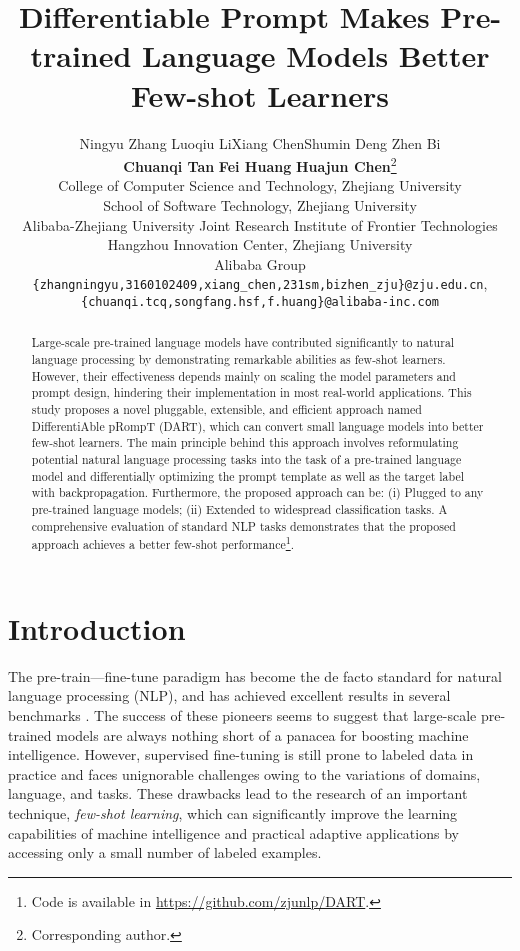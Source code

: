 \documentclass{article} \usepackage{iclr2022_conference,times}
\title{Differentiable Prompt Makes Pre-trained Language Models Better Few-shot Learners}
\author{Ningyu Zhang \quad Luoqiu Li\quad Xiang Chen\quad Shumin Deng \quad Zhen Bi \\ \textbf{Chuanqi Tan} \quad \textbf{Fei Huang} \quad \textbf{Huajun Chen}\thanks{Corresponding author.}\\
  College of Computer Science and Technology, Zhejiang University\\
  School of Software Technology, Zhejiang University\\
  Alibaba-Zhejiang University Joint Research Institute of Frontier Technologies\\
  Hangzhou Innovation Center, Zhejiang University \\
  Alibaba Group\\
  \texttt{\{zhangningyu,3160102409,xiang\_chen,231sm,bizhen\_zju\}@zju.edu.cn},\\ 
  \texttt{\{chuanqi.tcq,songfang.hsf,f.huang\}@alibaba-inc.com}
}
\begin{document}
\maketitle

\begin{abstract}
Large-scale pre-trained language models have contributed significantly to natural language processing by demonstrating remarkable abilities as few-shot learners. However, their effectiveness depends mainly on scaling the model parameters and prompt design, hindering their implementation in most real-world applications. This study proposes a novel pluggable, extensible, and efficient approach named DifferentiAble pRompT (DART), which can convert small language models into better few-shot learners. The main principle behind this approach involves reformulating potential natural language processing tasks into the task of a pre-trained language model and differentially optimizing the prompt template as well as the target label with backpropagation. Furthermore, the proposed approach can be: (i) Plugged to any pre-trained language models; (ii) Extended to widespread classification tasks. A comprehensive evaluation of standard NLP tasks demonstrates that the proposed approach achieves a better few-shot performance\footnote{Code is available in \url{https://github.com/zjunlp/DART}.}. 
\end{abstract}


\section{Introduction}

The pre-train—fine-tune paradigm has become the de facto standard for natural language processing (NLP), and has achieved excellent results in several benchmarks \citep{DBLP:conf/naacl/DevlinCLT19,DBLP:journals/corr/abs-1907-11692,DBLP:conf/acl/LewisLGGMLSZ20,DBLP:conf/nips/00040WWLWGZH19,DBLP:conf/icml/Bao0WW0L0GP0H20}. 
The success of these pioneers seems to suggest that large-scale pre-trained models are always nothing short of a panacea for boosting machine intelligence. 
However, supervised fine-tuning is still prone to labeled data in practice and faces unignorable challenges owing to the variations of domains, language, and tasks.
These drawbacks lead to the research of an important technique, \textit{few-shot learning}, which can significantly improve the learning capabilities of machine intelligence and practical adaptive applications by accessing only a small number of labeled examples.
\end{document}
